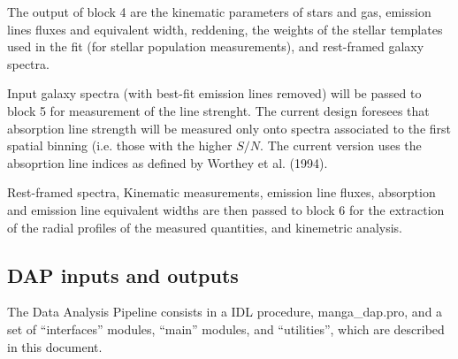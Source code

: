 The output of block 4 are the kinematic
parameters of stars and gas, emission lines fluxes and equivalent
width, reddening, the weights of the stellar templates used in the fit
(for stellar population measurements), and rest-framed galaxy spectra.

Input galaxy spectra (with best-fit emission lines removed) will be
passed to block 5 for measurement of the line strenght. The current
design foresees that absorption line strength will be measured only
onto spectra associated to the first spatial binning (i.e. those with
the higher $S/N$. The current version uses the absoprtion line indices
as defined by Worthey et al. (1994).

Rest-framed spectra, Kinematic measurements, emission line fluxes,
absorption and emission line equivalent widths are then passed to
block 6 for the extraction of the radial profiles of the measured
quantities, and kinemetric analysis.

\subsection{DAP inputs and outputs}
\label{dap_sec:dap_inputs_outputs}

The Data Analysis Pipeline consists in a IDL procedure,
manga\_dap.pro, and a set of ``interfaces'' modules, ``main'' modules,
and ``utilities'', which are described in this document.

